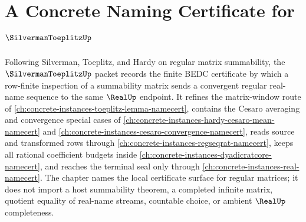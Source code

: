 \chapter{A Concrete Naming Certificate for $\SilvermanToeplitzUp$}
\label{ch:concrete-instances-silverman-toeplitz-namecert}

Following Silverman, Toeplitz, and Hardy on regular matrix summability, the $\SilvermanToeplitzUp$ packet records the finite BEDC certificate by which a row-finite inspection of a summability matrix sends a convergent regular real-name sequence to the same $\RealUp$ endpoint. It refines the matrix-window route of \autoref{ch:concrete-instances-toeplitz-lemma-namecert}, contains the Cesaro averaging and convergence special cases of \autoref{ch:concrete-instances-hardy-cesaro-mean-namecert} and \autoref{ch:concrete-instances-cesaro-convergence-namecert}, reads source and transformed rows through \autoref{ch:concrete-instances-regseqrat-namecert}, keeps all rational coefficient budgets inside \autoref{ch:concrete-instances-dyadicratcore-namecert}, and reaches the terminal seal only through \autoref{ch:concrete-instances-real-namecert}. The chapter names the local certificate surface for regular matrices; it does not import a host summability theorem, a completed infinite matrix, quotient equality of real-name streams, countable choice, or ambient $\RealUp$ completeness.

